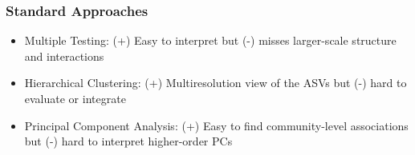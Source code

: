 

\begin{frame}
  \frametitle{Standard Approaches}
  \begin{itemize}
    \item Multiple Testing: (+) Easy to interpret but (-) misses larger-scale
    structure and interactions
    \item Hierarchical Clustering: (+) Multiresolution view of the ASVs but (-)
    hard to evaluate or integrate
    \item Principal Component Analysis: (+) Easy to find community-level
    associations but (-) hard to interpret higher-order PCs
  \end{itemize}
\end{frame}
